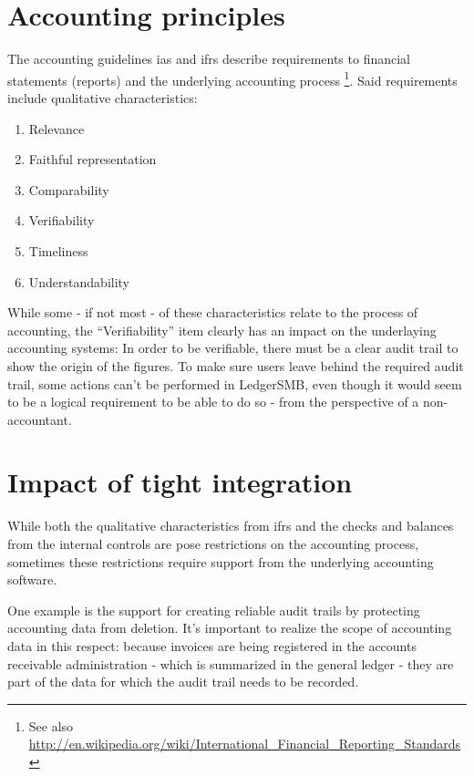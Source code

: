 \section{Accounting principles}
\label{sec-system-accounting-principles}

The accounting guidelines \gls{ias} and \gls{ifrs} describe requirements
to financial statements (reports) and the underlying accounting process
\footnote{See also \url{http://en.wikipedia.org/wiki/International_Financial_Reporting_Standards}}.
Said requirements include qualitative characteristics:

\begin{enumerate}
\item Relevance
\item Faithful representation
\item Comparability
\item Verifiability
\item Timeliness
\item Understandability
\end{enumerate}

While some - if not most - of these characteristics relate to the process of accounting,
the ``Verifiability'' item clearly has an impact on the underlaying accounting systems:
In order to be verifiable, there must be a clear audit trail to show the origin of the
figures. To make sure users leave behind the required audit trail, some actions can't
be performed in LedgerSMB, even though it would seem to be a logical requirement to be
able to do so - from the perspective of a non-accountant.


\section{Impact of tight integration}
\label{sec-system-impact-of-tight-integration}

While both the qualitative characteristics from \gls{ifrs} and the checks and balances
from the internal controls are pose restrictions on the accounting process,
sometimes these restrictions require support from the underlying accounting
software.

One example is the support for creating reliable audit trails
by protecting accounting data from deletion. It's important to realize the scope
of accounting data in this respect: because invoices are being registered in the
accounts receivable administration - which is summarized in the general ledger -
they are part of the data for which the audit trail needs to be recorded.

